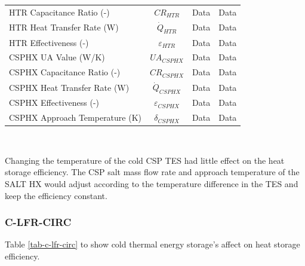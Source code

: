 \begin{paracol}{2}
\begin{specialtable}[H]
\begin{tabular}{lccc}
    HTR Capacitance Ratio (-)	&	$CR_{HTR}$	&	Data	&	Data	\\
    HTR Heat Transfer Rate (W)	&	$\dot{Q}_{HTR}$	&	Data	&	Data	\\
    HTR Effectiveness (-)	&	$\varepsilon_{HTR}$	&	Data	&	Data	\\
    CSPHX UA Value (W/K)	&	$UA_{CSPHX}$	&	Data	&	Data	\\
    CSPHX Capacitance Ratio (-)	&	$CR_{CSPHX}$	&	Data	&	Data	\\
    CSPHX Heat Transfer Rate (W)	&	$\dot{Q}_{CSPHX}$	&	Data	&	Data	\\
    CSPHX Effectiveness (-)	&	$\varepsilon_{CSPHX}$	&	Data	&	Data	\\
    CSPHX Approach Temperature (K)	&	$\delta_{CSPHX}$	&	Data	&	Data	\\
    
    \bottomrule
    \end{tabular}\\
\end{specialtable}

Changing the temperature of the cold CSP TES had little effect on the heat storage efficiency. The CSP salt mass flow rate and approach temperature of the SALT HX would adjust according to the temperature difference in the TES and keep the efficiency constant.

\subsubsection{C-LFR-CIRC}

Table \ref{tab-c-lfr-circ} to show cold thermal energy storage's affect on heat storage efficiency.


\end{paracol}

